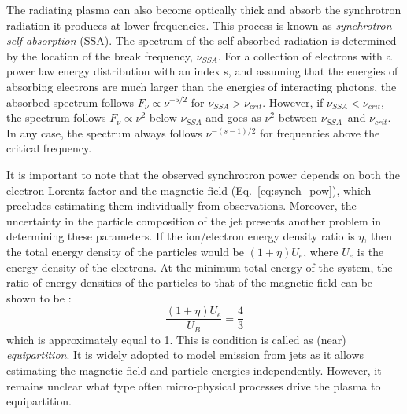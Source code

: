 The radiating plasma can also become optically thick and absorb the synchrotron radiation it produces at lower frequencies. This process is known as \textit{synchrotron self-absorption} (SSA). The spectrum of the self-absorbed radiation is determined by the location of the break frequency, $\nu_{SSA}$. For a collection of electrons with a power law energy distribution with an index s, and assuming that the energies of absorbing electrons are much larger than the energies of interacting photons, the absorbed spectrum follows $F_\nu\propto \nu^{-5/2}$ for $\nu_{SSA}>\nu_{crit}$. However, if $\nu_{SSA}<\nu_{crit}$, the spectrum follows $F_\nu\propto \nu^{2}$ below $\nu_{SSA}$ and goes as $\nu^2$ between $\nu_{SSA}$~and $\nu_{crit}$. In any case, the spectrum always follows $\nu^{-(s-1)/2}$ for frequencies above the critical frequency.

It is important to note that the observed synchrotron power depends on both the electron Lorentz factor and the magnetic field (Eq.~\ref{eq:synch_pow}), which precludes estimating them individually from observations. Moreover, the uncertainty in the particle composition of the jet presents another problem in determining these parameters. If the ion/electron energy density ratio is $\eta$, then the total energy density of the particles would be $(1+\eta)U_e$, where $U_e$ is the energy density of the electrons. At the minimum total energy of the system, the ratio of energy densities of the particles to that of the magnetic field can be shown to be \citep{longair_2011}:
\begin{equation}
    \frac{(1+\eta)U_e}{U_B}=\frac{4}{3}
\end{equation}
which is approximately equal to 1. This is condition is called as (near) \textit{equipartition}. It is widely adopted to model emission from jets as it allows estimating the magnetic field and particle energies independently. However, it remains unclear what type often micro-physical processes drive the plasma to equipartition.


